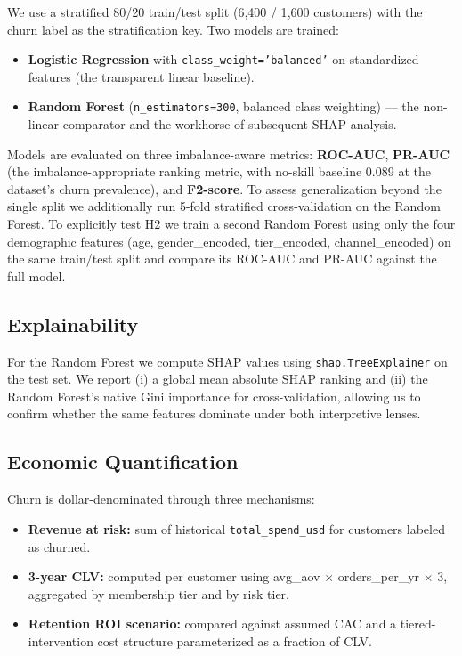 \documentclass[conference]{IEEEtran}
\begin{document}
We use a stratified 80/20 train/test split (6{,}400 / 1{,}600 customers) with the churn label as the stratification key. Two models are trained:

\begin{itemize}
\item \textbf{Logistic Regression} with \texttt{class\_weight='balanced'} on standardized features (the transparent linear baseline).
\item \textbf{Random Forest} (\texttt{n\_estimators=300}, balanced class weighting) — the non-linear comparator and the workhorse of subsequent SHAP analysis.
\end{itemize}

Models are evaluated on three imbalance-aware metrics: \textbf{ROC-AUC}, \textbf{PR-AUC} (the imbalance-appropriate ranking metric, with no-skill baseline 0.089 at the dataset's churn prevalence), and \textbf{F2-score}. To assess generalization beyond the single split we additionally run 5-fold stratified cross-validation on the Random Forest. To explicitly test H2 we train a second Random Forest using only the four demographic features (age, gender\_encoded, tier\_encoded, channel\_encoded) on the same train/test split and compare its ROC-AUC and PR-AUC against the full model.

\subsection{Explainability}

For the Random Forest we compute SHAP values using \texttt{shap.TreeExplainer} on the test set. We report (i) a global mean absolute SHAP ranking and (ii) the Random Forest's native Gini importance for cross-validation, allowing us to confirm whether the same features dominate under both interpretive lenses.

\subsection{Economic Quantification}

Churn is dollar-denominated through three mechanisms:

\begin{itemize}
\item \textbf{Revenue at risk:} sum of historical \texttt{total\_spend\_usd} for customers labeled as churned.
\item \textbf{3-year CLV:} computed per customer using avg\_aov $\times$ orders\_per\_yr $\times$ 3, aggregated by membership tier and by risk tier.
\item \textbf{Retention ROI scenario:} compared against assumed CAC and a tiered-intervention cost structure parameterized as a fraction of CLV.
\end{itemize}
\end{document}
